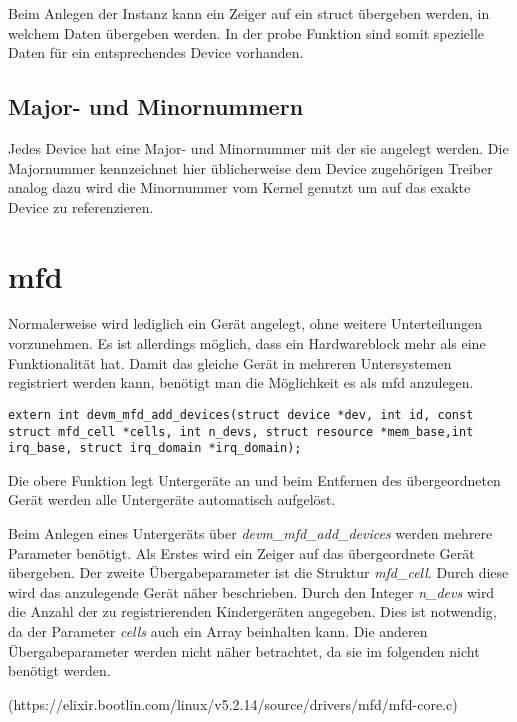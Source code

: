 Beim Anlegen der Instanz kann ein Zeiger auf ein struct übergeben werden, in welchem Daten übergeben werden. In der probe Funktion sind somit spezielle Daten für ein entsprechendes Device vorhanden. \cite{corbetplatform} 


\subsection{Major- und Minornummern}\label{sec:mmnum_t}
Jedes Device hat eine Major- und Minornummer mit der sie angelegt werden.
Die Majornummer kennzeichnet hier üblicherweise dem Device zugehörigen Treiber analog dazu wird die Minornummer vom Kernel genutzt um auf das exakte Device zu referenzieren. \citep[S. 43f]{corbet2005linux} 


\section{\acl{mfd}}\label{sec:mfd_t}
Normalerweise wird lediglich ein Gerät angelegt, ohne weitere Unterteilungen vorzunehmen. Es ist allerdings möglich, dass ein Hardwareblock mehr als eine Funktionalität hat. Damit das gleiche Gerät in mehreren Untersystemen registriert werden kann, benötigt man die Möglichkeit es als \ac{mfd} anzulegen. \cite{bellonimfd}


\begin{lstlisting}
extern int devm_mfd_add_devices(struct device *dev, int id, const struct mfd_cell *cells, int n_devs, struct resource *mem_base,int irq_base, struct irq_domain *irq_domain);
\end{lstlisting}

Die obere Funktion legt Untergeräte an und beim Entfernen des übergeordneten Gerät  werden alle Untergeräte automatisch aufgelöst.


Beim Anlegen eines Untergeräts über \textit{devm\_mfd\_add\_devices} werden mehrere Parameter benötigt. Als Erstes wird ein Zeiger auf das übergeordnete Gerät übergeben. Der zweite Übergabeparameter ist die Struktur \textit{mfd\_cell}. Durch diese wird das anzulegende Gerät näher beschrieben.
Durch den Integer \textit{n\_devs} wird die Anzahl der zu registrierenden Kindergeräten angegeben. Dies ist notwendig, da der Parameter \textit{cells} auch ein Array beinhalten kann. Die anderen Übergabeparameter werden nicht näher betrachtet, da sie im folgenden nicht benötigt werden.

(https://elixir.bootlin.com/linux/v5.2.14/source/drivers/mfd/mfd-core.c)




